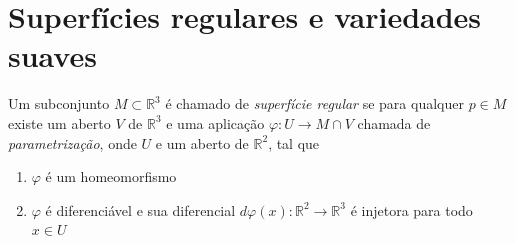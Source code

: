 \section{Superfícies regulares e variedades suaves}

\begin{defi}
Um subconjunto $M \subset \mathbb{R}^3$ é chamado de \emph{superfície regular} se para qualquer $p \in M$ existe um aberto $V$ de $\mathbb{R}^3$ e uma aplicação $\varphi: U \rightarrow M \cap V$ chamada de \emph{parametrização}, onde $U$ e um aberto de $\mathbb{R}^2$, tal que
\begin{enumerate}
    \item $\varphi$ é um homeomorfismo
    \item $\varphi$ é diferenciável e sua diferencial $d\varphi(x): \mathbb{R}^2 \rightarrow \mathbb{R}^3$ é injetora para todo $x \in U$
\end{enumerate}
\end{defi}

